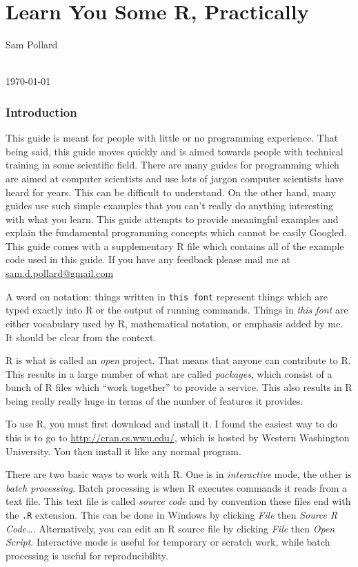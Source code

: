 \documentclass[12pt]{article}
\theoremstyle{remark}
\begin{document}
\part{Learn You Some R, Practically}
\begin{center}
	\begin{Large}
	Sam Pollard
	\end{Large}
	\\
	\today
\end{center}
\section{Introduction}

This guide is meant for people with little or no programming experience. That being said, this guide moves quickly and is aimed towards people with technical training in some scientific field. There are many guides for programming which are aimed at computer scientists and use lots of jargon computer scientists have heard for years. This can be difficult to understand. On the other hand, many guides use such simple examples that you can't really do anything interesting with what you learn. This guide attempts to provide meaningful examples and explain the fundamental programming concepts which cannot be easily Googled. This guide comes with a supplementary R file which contains all of the example code used in this guide. If you have any feedback please mail me at \url{sam.d.pollard@gmail.com}

A word on notation: things written in \verb|this font| represent things which are typed exactly into R or the output of running commands. Things in \emph{this font} are either vocabulary used by R, mathematical notation, or emphasis added by me. It should be clear from the context.

R is what is called an \emph{open} project. That means that anyone can contribute to R. This results in a large number of what are called \emph{packages}, which consist of a bunch of R files which ``work together'' to provide a service. This also results in R being really really huge in terms of the number of features it provides.

To use R, you must first download and install it. I found the easiest way to do this is to go to \url{http://cran.cs.wwu.edu/}, which is hosted by Western Washington University. You then install it like any normal program.

There are two basic ways to work with R. One is in \emph{interactive} mode, the other is \emph{batch processing}. Batch processing is when R executes commands it reads from a text file. This text file is called \emph{source code} and by convention these files end with the \verb|.R| extension. This can be done in Windows by clicking \emph{File} then \emph{Source R Code\dots}. Alternatively, you can edit an R source file by clicking \emph{File} then \emph{Open Script}. Interactive mode is useful for temporary or scratch work, while batch processing is useful for reproducibility.
\end{document}
